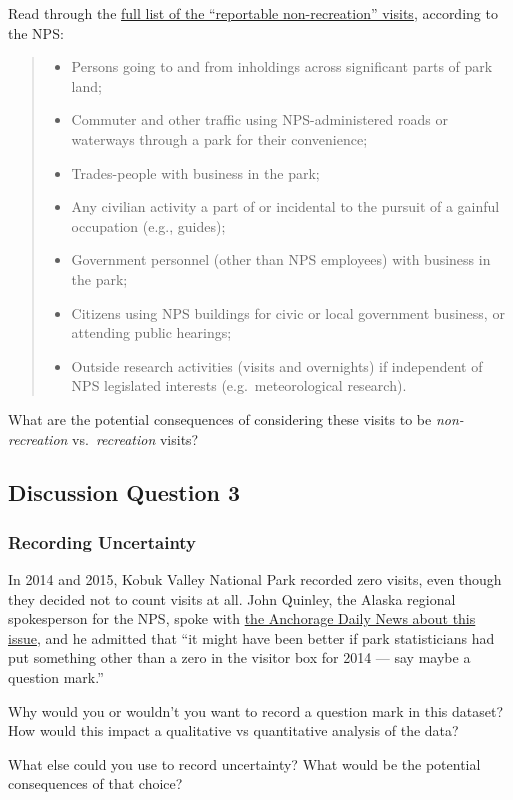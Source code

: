 \documentclass[
  letterpaper,
  DIV=11,
  numbers=noendperiod]{scrartcl}
\providecommand{\tightlist}{%
  \setlength{\itemsep}{0pt}\setlength{\parskip}{0pt}}\usepackage{longtable,booktabs,array}
\begin{document}
Read through the
\href{https://www.nps.gov/subjects/socialscience/nps-visitor-use-statistics-definitions.htm}{full
list of the ``reportable non-recreation'' visits}, according to the NPS:

\begin{quote}
\begin{itemize}
\tightlist
\item
  Persons going to and from inholdings across significant parts of park
  land;
\item
  Commuter and other traffic using NPS-administered roads or waterways
  through a park for their convenience;
\item
  Trades-people with business in the park;
\item
  Any civilian activity a part of or incidental to the pursuit of a
  gainful occupation (e.g., guides);
\item
  Government personnel (other than NPS employees) with business in the
  park;
\item
  Citizens using NPS buildings for civic or local government business,
  or attending public hearings;
\item
  Outside research activities (visits and overnights) if independent of
  NPS legislated interests (e.g.~meteorological research).
\end{itemize}
\end{quote}

What are the potential consequences of considering these visits to be
\emph{non-recreation} vs.~\emph{recreation} visits?

\subsection{Discussion Question 3}\label{discussion-question-3-1}

\subsubsection{Recording Uncertainty}\label{recording-uncertainty}

In 2014 and 2015, Kobuk Valley National Park recorded zero visits, even
though they decided not to count visits at all. John Quinley, the Alaska
regional spokesperson for the NPS, spoke with
\href{https://www.adn.com/outdoors/article/alaskas-little-visited-parks/2015/02/18/}{the
Anchorage Daily News about this issue}, and he admitted that ``it might
have been better if park statisticians had put something other than a
zero in the visitor box for 2014 --- say maybe a question mark.''

Why would you or wouldn't you want to record a question mark in this
dataset? How would this impact a qualitative vs quantitative analysis of
the data?

What else could you use to record uncertainty? What would be the
potential consequences of that choice?
\end{document}
